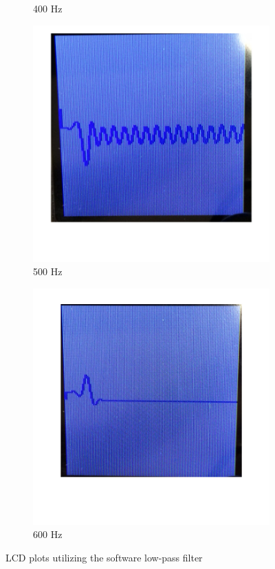 \documentclass[12pt]{article}
\begin{document}
\begin{figure}[H]
\begin{subfigure}[b]{0.3\textwidth}
    \caption{400 Hz}
    \label{fig:filtered_400}
  \end{subfigure}
  \begin{subfigure}[b]{0.3\textwidth}
    \includegraphics[width=\textwidth]{./img/filtered_500Hz}
    \caption{500 Hz}
    \label{fig:filtered_500}
  \end{subfigure}
  \begin{subfigure}[b]{0.3\textwidth}
    \includegraphics[width=\textwidth]{./img/filtered_600Hz}
    \caption{600 Hz}
    \label{fig:filtered_600}
  \end{subfigure}
  \caption{LCD plots utilizing the software low-pass filter}
  \label{fig:lcd-plots-filtered}
\end{figure}
\end{document}
